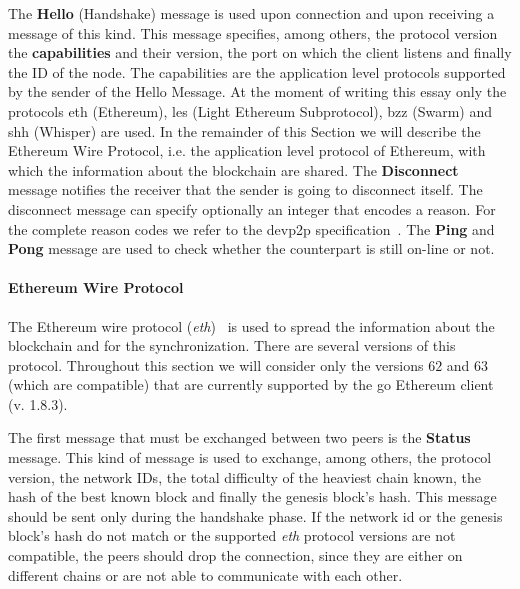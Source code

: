 The \textbf{Hello} (Handshake) message is used upon connection and upon
receiving a
message of this kind.
This message specifies, among others, the protocol version
the \textbf{capabilities} and their
version, the port on which the client listens and finally the ID of the node.
The capabilities are the application level protocols supported by the sender
of the Hello Message. At the moment of writing this essay only the protocols
eth (Ethereum), les (Light Ethereum Subprotocol), bzz (Swarm) and
shh (Whisper) are used. In the remainder of this
Section we will describe the Ethereum Wire Protocol, i.e. the application
level protocol of Ethereum, with which the information about the blockchain
are shared.
The \textbf{Disconnect} message notifies the receiver that the sender is going 
to disconnect itself. The disconnect message can specify optionally an
integer that encodes a reason.
For the complete reason codes we refer to the devp2p specification~\cite{}.
The \textbf{Ping} and \textbf{Pong} message are used to check whether the
counterpart is still on-line or not.

\paragraph{Ethereum Wire Protocol}
The Ethereum wire protocol
(\textit{eth})~\cite{bib:ethereumwireprotocol} is used to spread the information
about the blockchain and for the synchronization. There are several versions
of this protocol. Throughout this section we will consider only the versions
$62$ and $63$ (which are compatible) that are currently supported by the go
Ethereum client (v. 1.8.3).

The first message that must be exchanged between two peers
is the \textbf{Status} message. This kind of message is used to exchange,
among others, the protocol version, the network IDs, the total difficulty of the
heaviest chain known, the hash of the best known block and
finally the genesis block's hash. This message should be sent only during
the handshake phase.
If the network id or the genesis block's hash do not match or the supported
\emph{eth} protocol versions are not compatible, the peers should drop
the connection, since they are either on different chains or are not able to
communicate with each other.




